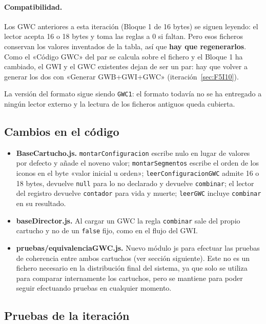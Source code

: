 \paragraph{Compatibilidad.} Los GWC anteriores a esta iteración (Bloque 1 de 16 bytes) se siguen leyendo: el lector acepta 16 o 18 bytes y toma las reglas a 0 si faltan. Pero esos ficheros conservan los valores inventados de la tabla, así que \textbf{hay que regenerarlos}. Como el «Código GWC» del par se calcula sobre el fichero y el Bloque 1 ha cambiado, el GWI y el GWC existentes dejan de ser un par: hay que volver a generar los dos con «Generar GWB+GWI+GWC» (iteración~\ref{sec:F5I10}).

La versión del formato sigue siendo \texttt{GWC1}: el formato todavía no se ha entregado a ningún lector externo y la lectura de los ficheros antiguos queda cubierta.

\subsection{Cambios en el código}
\label{sec:F5I13Codigo}

\begin{itemize}
	\item \textbf{BaseCartucho.js.} \texttt{montarConfiguracion} escribe nulo en lugar de valores por defecto y añade el noveno valor; \texttt{montarSegmentos} escribe el orden de los iconos en el byte «valor inicial u orden»; \texttt{leerConfiguracionGWC} admite 16 o 18 bytes, devuelve \texttt{null} para lo no declarado y devuelve \texttt{combinar}; el lector del registro devuelve \texttt{contador} para vida y muerte; \texttt{leerGWC} incluye \texttt{combinar} en su resultado.
	\item \textbf{baseDirector.js.} Al cargar un GWC la regla \texttt{combinar} sale del propio cartucho y no de un \texttt{false} fijo, como en el flujo del GWI.
	\item \textbf{pruebas/equivalenciaGWC.js.} Nuevo módulo js para efectuar las pruebas de coherencia entre ambos cartuchos (ver sección siguiente). Este no es un fichero necesario en la distribución final del sistema, ya que solo se utiliza para comparar internamente los cartuchos, pero se mantiene para poder seguir efectuando pruebas en cualquier momento.
\end{itemize}

\subsection{Pruebas de la iteración}
\label{sec:F5I13Pruebas}

